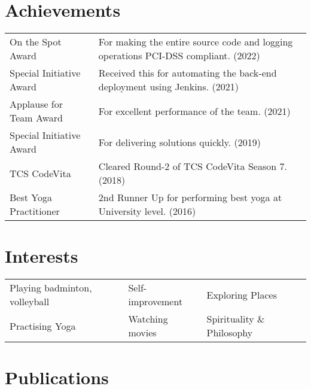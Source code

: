 \documentclass[a4paper,10.5pt]{article}
\begin{document}
\section{Achievements}
\begin{tabularx}{\linewidth}{@{}l X@{}}	
On the Spot Award & For making the entire source code and logging operations PCI-DSS compliant. (2022) \\
Special Initiative Award & Received this for automating the back-end deployment using Jenkins. (2021) \\
Applause for Team Award & For excellent performance of the team. (2021) \\
Special Initiative Award & For delivering solutions quickly. (2019) \\
TCS CodeVita & Cleared Round-2 of TCS CodeVita Season 7. (2018) \\
Best Yoga Practitioner & 2nd Runner Up for performing best yoga at University level. (2016) \\
\end{tabularx}

\section{Interests}
\begin{tabularx}{\linewidth}{@{}X @{}X @{}X}	
Playing badminton, volleyball & Self-improvement & Exploring Places \\
Practising Yoga & Watching movies & Spirituality \& Philosophy\\
\end{tabularx}


\section{Publications}
\begin{refsection}
\nocite{*}
\printbibliography[heading=none]
\end{refsection}

\vfill
{}
        
\end{document}
